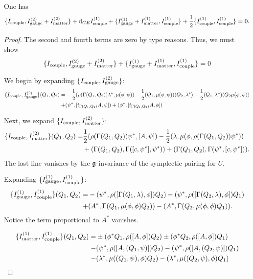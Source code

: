 \documentclass[10pt, oneside]{article}
\begin{document}
\begin{lem}
One has
\[
\{I_{\rm couple}, I^{(2)}_{\rm gauge} + I^{(2)}_{\rm matter}\} + {\rm d}_{CE} I^{(1)}_{\rm couple} + \{I^{(1)}_{\rm gauge} + I^{(1)}_{\rm matter}, I^{(1)}_{\rm couple}\} + \frac{1}{2} \{I_{\rm couple}^{(1)}, I_{\rm couple}^{(1)}\} =  0.
\]
\end{lem}
\begin{proof}
The second and fourth terms are zero by type reasons.
Thus, we must show
\begin{equation}\label{CMEcouple2}
\{I_{\rm couple}, I^{(2)}_{\rm gauge} + I^{(2)}_{\rm matter}\} +  \{I^{(1)}_{\rm gauge} + I^{(1)}_{\rm matter}, I^{(1)}_{\rm couple}\} = 0
\end{equation}

We begin by expanding $\{I_{\rm couple}, I^{(2)}_{\rm gauge}\}$:
\begin{align*}
\{I_{\rm couple}, I^{(2)}_{\rm gauge}\} (Q_1,Q_2) = & - \frac{1}{2} (\rho(\Gamma(Q_1,Q_2)) \lambda^*, \mu(\phi,\psi)) - \frac{1}{2} (Q_1, \mu(\phi, \psi)) (Q_2, \lambda^*) - \frac{1}{2} (Q_1, \lambda^*)(Q_2 \mu(\phi,\psi)) \\ + & (\psi^*, [i_{\Gamma(Q_1,Q_2)} A , \psi]) + (\phi^*, [i_{\Gamma(Q_1,Q_2)} A , \phi])
\end{align*}

Next, we expand $\{I_{\rm couple}, I^{(2)}_{\rm matter}\}$:
\begin{align*}
\{I_{\rm couple}, I^{(2)}_{\rm matter}\} (Q_1,Q_2) = & \frac{1}{2} (\rho(\Gamma(Q_1,Q_2)) \psi^*, [A, \psi]) - \frac{1}{2}(\lambda, \mu(\phi, \rho(\Gamma(Q_1,Q_2)) \psi^*)) \\ & + (\Gamma(Q_1, Q_2), \Gamma([c, \psi^*], \psi^*)) + (\Gamma(Q_1, Q_2), \Gamma(\psi^*, [c, \psi^*])).
\end{align*} 
The last line vanishes by the $\mathfrak g$-invariance of the symplectic pairing for $U$. 

Expanding $\{I^{(1)}_{\rm gauge}, I^{(1)}_{\rm couple}\}$:
\begin{align*}
\{I^{(1)}_{\rm gauge}, I^{(1)}_{\rm couple}\}(Q_1,Q_2) = & - (\psi^*, \rho([\Gamma(Q_1, \lambda), \phi]) Q_2) -(\psi^*, \rho([\Gamma(Q_2, \lambda), \phi]) Q_1) \\ + & (A^*, \Gamma(Q_1, \mu(\phi, \phi) Q_2)) - (A^*, \Gamma(Q_2, \mu(\phi, \phi) Q_1)) . 
\end{align*}
Notice the term proportional to $A^*$ vanishes. 

\begin{align*}
\{I^{(1)}_{\rm matter}, I^{(1)}_{\rm couple}\}  (Q_1,Q_2) = & \pm (\phi^* Q_1 , \rho([A,\phi]) Q_2) \pm (\phi^* Q_2 , \rho([A,\phi]) Q_1) \\ -  &  (\psi^*, \rho([A, (Q_1, \psi)]) Q_2) - (\psi^*, \rho([A, (Q_2, \psi)]) Q_1) \\ - & (\lambda^*, \mu((Q_1, \psi), \phi) Q_2) -  (\lambda^*, \mu((Q_2, \psi), \phi) Q_1) 
\end{align*}


\end{proof}
\end{document}
